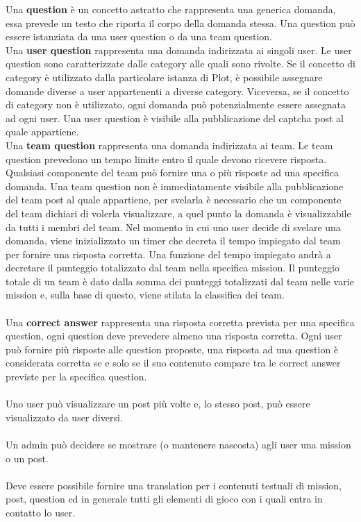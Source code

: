 Una \textbf{question} è un concetto astratto che rappresenta una generica domanda, essa prevede un testo che riporta il corpo della domanda stessa. Una question può essere istanziata da una user question o da una team question.\\
Una \textbf{user question} rappresenta una domanda indirizzata ai singoli user. Le user question sono caratterizzate dalle category alle quali sono rivolte. Se il concetto di category è utilizzato dalla particolare istanza di Plot, è possibile assegnare domande diverse a user appartenenti a diverse category. Viceversa, se il concetto di category non è utilizzato, ogni domanda può potenzialmente essere assegnata ad ogni user.
Una user question è visibile alla pubblicazione del captcha post al quale appartiene.\\
Una \textbf{team question} rappresenta una domanda indirizzata ai team. Le team question prevedono un tempo limite entro il quale devono ricevere risposta. Qualsiasi componente del team può fornire una o più risposte ad una specifica domanda.
Una team question non è immediatamente visibile alla pubblicazione del team post al quale appartiene, per svelarla è necessario che un componente del team dichiari di volerla visualizzare, a quel punto la domanda è visualizzabile da tutti i membri del team. Nel momento in cui uno user decide di svelare una domanda, viene inizializzato un timer che decreta il tempo impiegato dal team per fornire una risposta corretta. Una funzione del tempo impiegato andrà a decretare il punteggio totalizzato dal team nella specifica mission. Il punteggio totale di un team è dato dalla somma dei punteggi totalizzati dal team nelle varie mission e, sulla base di questo, viene stilata la classifica dei team.
\\ \\
Una \textbf{correct answer} rappresenta una risposta corretta prevista per una specifica question, ogni question deve prevedere almeno una risposta corretta.
Ogni user può fornire più risposte alle question proposte, una risposta ad una question è considerata corretta se e solo se il suo contenuto compare tra le correct answer previste per la specifica question.
\\ \\
Uno user può visualizzare un post più volte e, lo stesso post, può essere visualizzato da user diversi.
\\ \\
Un admin può decidere se mostrare (o mantenere nascosta) agli user una mission o un post.
\\ \\
Deve essere possibile fornire una translation per i contenuti testuali di mission, post, question ed in generale tutti gli elementi di gioco con i quali entra in contatto lo user.

